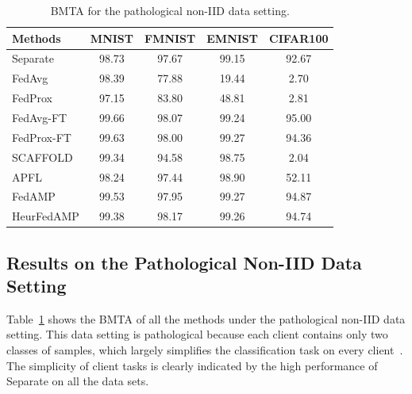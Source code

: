 \begin{table}[t]
\setlength{\tabcolsep}{2pt}
\centering
\begin{tabular}{l|cccc} 
 \toprule
Methods & MNIST & FMNIST & EMNIST & CIFAR100 \\ 
 \midrule
 Separate & 98.73 & 97.67 &	99.15 &	  92.67\\
 \hline
 FedAvg  & 98.39 & 77.88 & 19.44 &  2.70\\ 
 FedProx & 97.15 & 83.80 & 48.81 &  2.81\\ 
 \hline
 FedAvg-FT & 99.66 & 98.07 & 99.24 &  95.00 \\
 FedProx-FT & 99.63 & 98.00 & 99.27 & 94.36 \\
 SCAFFOLD & 99.34 & 94.58 & 98.75 & 2.04\\
 APFL & 98.24 & 97.44 & 98.90 & 52.11\\
 \hline
 {FedAMP} & 99.53 & 97.95 &	99.27 & 94.87\\ 
 {HeurFedAMP} & 99.38 & 98.17 & 99.26 &  94.74\\
 \bottomrule
\end{tabular}
\caption{BMTA for the pathological non-IID data setting.}
\label{tab:result_NonIIDNonGrouping}
\end{table}

\subsection{Results on the Pathological Non-IID Data Setting}\label{subsec:expres-2}
Table~\ref{tab:result_NonIIDNonGrouping} shows the BMTA of all the methods under the pathological non-IID data setting. 
This data setting is pathological because each client contains only two classes of samples, which largely simplifies the classification task on every client~\cite{mcmahan2016communication}.
The simplicity of client tasks is clearly indicated by the high performance of Separate on all the data sets.

